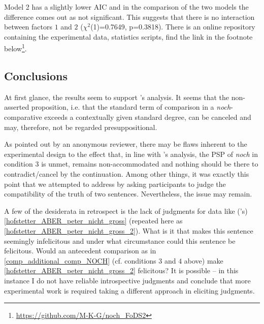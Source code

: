 \documentclass[output=paper,
modfonts
]{langscibook}
\begin{document}
Model 2 has a slightly lower AIC and in the comparison of the two models the difference comes out as not significant. This suggests that there is no interaction between factors $1$ and $2$ ($\chi^{2}$(1)=0.7649, p=0.3818). There is an online repository containing the experimental data, statistics scripts, find the link in the footnote below\footnote{\url{https://github.com/M-K-G/noch_FoDS2}}\citet{github_website}.

\subsection{Conclusions}
At first glance, the results seem to support \citeauthor{umbach2009a_comp}'s \citeyearpar{umbach2009a_comp} analysis. It seems that the non-asserted proposition, i.e. that the standard term of comparison in a \textit{noch}-comparative exceeds a contextually given standard degree, can be canceled and may, therefore, not be regarded presuppositional.

As pointed out by an anonymous reviewer, there may be flaws inherent to the experimental design to the effect that, in line with \citeauthor{Hofstetter2013}'s analysis, the PSP of \textit{noch} in condition $3$ is unmet, remains non-accommodated and nothing should be there to contradict/cancel by the continuation. Among other things, it was exactly this point that we attempted to address by asking participants to judge the compatibility of the truth of two sentences. Nevertheless, the issue may remain.

A few of the desiderata in retrospect is the lack of judgments for data like (\citeauthor{Hofstetter2013}'s) \ref{hofstetter_ABER_peter_nicht_gross} (repeated here as \ref{hofstetter_ABER_peter_nicht_gross_2}). What is it that makes this sentence seemingly infelicitous and under what circumstance could this sentence be felicitous. Would an antecedent comparison as in \ref{comp_additional_comp_NOCH} (cf. conditions $3$ and $4$ above) make \ref{hofstetter_ABER_peter_nicht_gross_2} felicitous? It is possible -- in this instance I do not have reliable introspective judgments and conclude that more experimental work is required taking a different approach in eliciting judgments. %
\end{document}
